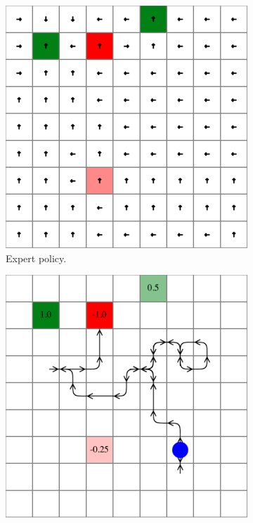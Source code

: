 \begin{figure}
    \centering
    \begin{subfigure}[b]{0.45\textwidth}
        \centering
        \includegraphics[width=\textwidth]{figures/distribution_over_failures/policy.pdf}
        \caption{Expert policy.}
        \label{fig:dof_policy}
    \end{subfigure}
    \hfill
    \begin{subfigure}[b]{0.45\textwidth}
        \centering
        \includegraphics[width=\textwidth]{figures/distribution_over_failures/falsification_failure.pdf}

\end{subfigure}
\end{figure}

